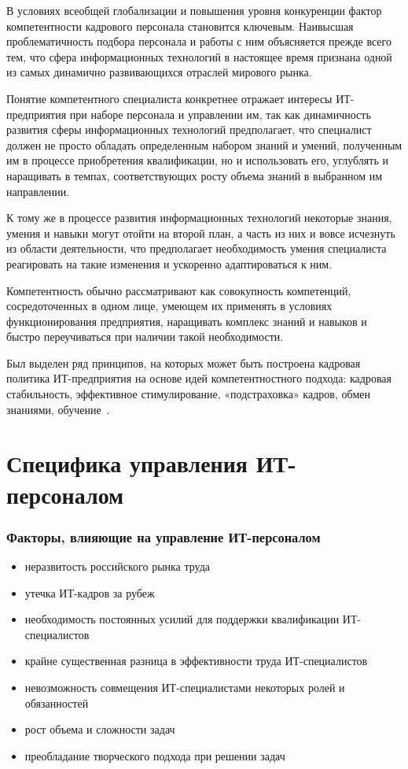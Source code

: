 \documentclass{../industrial-development}
\begin{document}
В условиях всеобщей глобализации и повышения уровня конкуренции фактор компетентности кадрового персонала становится ключевым. Наивысшая проблематичность подбора персонала и работы с ним объясняется прежде всего тем, что сфера информационных технологий в настоящее время признана одной из самых динамично развивающихся отраслей мирового рынка.

Понятие компетентного специалиста конкретнее отражает интересы ИТ-предприятия при наборе персонала и управлении им, так как динамичность развития сферы информационных технологий предполагает, что специалист должен не просто обладать определенным набором знаний и умений, полученным им в процессе приобретения квалификации, но и использовать его, углублять и наращивать в темпах, соответствующих росту объема знаний в выбранном им направлении.

К тому же в процессе развития информационных технологий некоторые знания, умения и навыки могут отойти на второй план, а часть из них и вовсе исчезнуть из области деятельности, что предполагает необходимость умения специалиста реагировать на такие изменения и ускоренно адаптироваться к ним.

Компетентность обычно рассматривают как совокупность компетенций, сосредоточенных в одном лице, умеющем их применять в условиях функционирования предприятия, наращивать комплекс знаний и навыков и быстро переучиваться при наличии такой необходимости. 

Был выделен ряд принципов, на которых может быть построена кадровая политика ИТ-предприятия на основе идей компетентностного подхода: кадровая стабильность, эффективное стимулирование, «подстраховка» кадров, обмен знаниями, обучение~\cite{Kasyanov}. 

\section{Специфика управления ИТ-персоналом}

\begin{frame} \frametitle{Факторы, влияющие на управление ИТ-персоналом}
  \begin{itemize}
  \item неразвитость российского рынка труда
  \item утечка ИТ-кадров за рубеж
	\item необходимость постоянных усилий для поддержки квалификации ИТ-специалистов
	\item крайне существенная разница в эффективности труда ИТ-специалистов
	\item невозможность совмещения ИТ-специалистами некоторых ролей и обязанностей
	\item рост объема и сложности задач
	\item преобладание творческого подхода при решении задач

    \end{itemize}
\end{frame}
\end{document}
